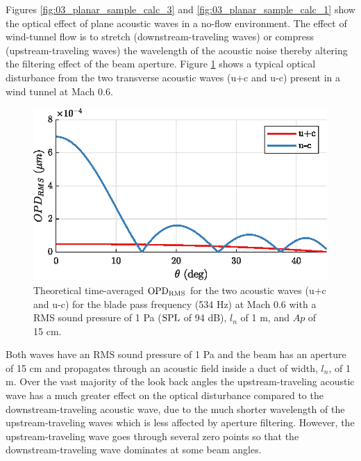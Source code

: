 Figures \ref{fig:03_planar_sample_calc_3} and \ref{fig:03_planar_sample_calc_1} show the optical effect of plane acoustic waves in a no-flow environment.
The effect of wind-tunnel flow is to stretch (downstream-traveling waves) or compress (upstream-traveling waves) the wavelength of the acoustic noise thereby altering the filtering effect of the beam aperture.
Figure \ref{fig:03_planar_sample_calc_2} shows a typical optical disturbance from the two transverse acoustic waves (u+c and u-c) present in a wind tunnel at Mach 0.6.
\begin{figure}
  \centering
  \includegraphics{../matlab/03_aero_optics_acoustics/planar_sample_calc_2.eps}
  \caption{Theoretical time-averaged $\operatorname{OPD_{RMS}}$ for the two acoustic waves (u+c and u-c) for the blade pass frequency (534 Hz) at Mach 0.6 with a RMS sound pressure of 1 Pa ($\operatorname{SPL}$ of 94 dB), $l_n$ of 1 m, and $Ap$ of 15 cm.}
  \label{fig:03_planar_sample_calc_2}
\end{figure}
Both waves have an RMS sound pressure of 1 Pa and the beam has an aperture of 15 cm and propagates through an acoustic field inside a duct of width, $l_n$, of 1 m.
Over the vast majority of the look back angles the upstream-traveling acoustic wave has a much greater effect on the optical disturbance compared to the downstream-traveling acoustic wave, due to the much shorter wavelength of the upstream-traveling waves which is less affected by aperture filtering.
However, the upstream-traveling wave goes through several zero points so that the downstream-traveling wave dominates at some beam angles.


